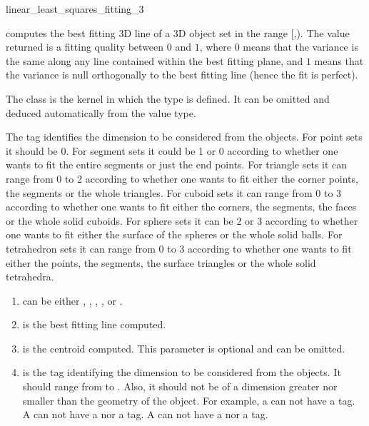 \begin{ccRefFunction}{linear_least_squares_fitting_3}

{ computes the best fitting 3D line of a 3D object set in the range
[,). The value returned is a fitting quality
between $0$ and $1$, where $0$ means that the variance is the same
along any line contained within the best fitting plane, and $1$ means that the variance is null orthogonally to the best fitting line (hence the fit is perfect). }

The class  is the kernel in which the type  is defined. It can be omitted and deduced automatically from the value type.

The tag  identifies the dimension to be considered from the objects. For point sets it should be 0. For segment sets it could be 1 or 0 according to whether one wants to fit the entire segments or just the end points. For triangle sets it can range from 0 to 2 according to whether one wants to fit either the corner points, the segments or the whole triangles. For cuboid sets it can range from 0 to 3 according to whether one wants to fit either the corners, the segments, the faces or the whole solid cuboids. For sphere sets it can be 2 or 3 according to whether one wants to fit either the surface of the spheres or the whole solid balls. For tetrahedron sets it can range from 0 to 3 according to whether one wants to fit either the points, the segments, the surface triangles or the whole solid tetrahedra.


\begin{enumerate}
   \item  {} can be either , 
          , , ,
           or .
   \item  {} is the best fitting line computed.
   \item  {} is the centroid computed. This parameter is optional and can be omitted.
   \item  {} is the tag identifying the dimension to be considered from the objects. It should range from  to . Also, it should not be of a dimension greater nor smaller than the geometry of the object. For example, a  can not have a  tag. A  can not have a  nor a  tag. A  can not have a  nor a  tag.
\end{enumerate}



\end{ccRefFunction}
